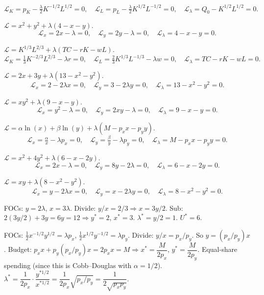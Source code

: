 \begin{solutions}
  \[
  \mathcal{L}_K = p_K - \tfrac{\lambda}{2} K^{-1/2} L^{1/2} = 0, \quad \mathcal{L}_L = p_L - \tfrac{\lambda}{2} K^{1/2} L^{-1/2} = 0, \quad \mathcal{L}_\lambda = Q_0 - K^{1/2} L^{1/2} = 0.
  \]
  \item $\mathcal{L} = x^2 + y^2 + \lambda(4 - x - y)$.
  \[
  \mathcal{L}_x = 2 x - \lambda = 0, \quad \mathcal{L}_y = 2 y - \lambda = 0, \quad \mathcal{L}_\lambda = 4 - x - y = 0.
  \]
  \item $\mathcal{L} = K^{1/3} L^{2/3} + \lambda(TC - r K - w L)$.
  \[
  \mathcal{L}_K = \tfrac{1}{3} K^{-2/3} L^{2/3} - \lambda r = 0, \quad \mathcal{L}_L = \tfrac{2}{3} K^{1/3} L^{-1/3} - \lambda w = 0, \quad \mathcal{L}_\lambda = TC - r K - w L = 0.
  \]
  \item $\mathcal{L} = 2 x + 3 y + \lambda(13 - x^2 - y^2)$.
  \[
  \mathcal{L}_x = 2 - 2 \lambda x = 0, \quad \mathcal{L}_y = 3 - 2 \lambda y = 0, \quad \mathcal{L}_\lambda = 13 - x^2 - y^2 = 0.
  \]
  \item $\mathcal{L} = x y^2 + \lambda(9 - x - y)$.
  \[
  \mathcal{L}_x = y^2 - \lambda = 0, \quad \mathcal{L}_y = 2 x y - \lambda = 0, \quad \mathcal{L}_\lambda = 9 - x - y = 0.
  \]
  \item $\mathcal{L} = \alpha \ln(x) + \beta \ln(y) + \lambda(M - p_x x - p_y y)$.
  \[
  \mathcal{L}_x = \tfrac{\alpha}{x} - \lambda p_x = 0, \quad \mathcal{L}_y = \tfrac{\beta}{y} - \lambda p_y = 0, \quad \mathcal{L}_\lambda = M - p_x x - p_y y = 0.
  \]
  \item $\mathcal{L} = x^2 + 4 y^2 + \lambda(6 - x - 2 y)$.
  \[
  \mathcal{L}_x = 2 x - \lambda = 0, \quad \mathcal{L}_y = 8 y - 2 \lambda = 0, \quad \mathcal{L}_\lambda = 6 - x - 2 y = 0.
  \]
  \item $\mathcal{L} = x y + \lambda(8 - x^2 - y^2)$.
  \[
  \mathcal{L}_x = y - 2 \lambda x = 0, \quad \mathcal{L}_y = x - 2 \lambda y = 0, \quad \mathcal{L}_\lambda = 8 - x^2 - y^2 = 0.
  \]
  \item FOCs: $y = 2 \lambda$, $x = 3 \lambda$. Divide: $y/x = 2/3 \Rightarrow x = 3 y / 2$. Sub: $2 (3 y/2) + 3 y = 6 y = 12 \Rightarrow y^* = 2$, $x^* = 3$. $\lambda^* = y/2 = 1$. $U^* = 6$.
  \item FOCs: $\tfrac{1}{2} x^{-1/2} y^{1/2} = \lambda p_x$, $\tfrac{1}{2} x^{1/2} y^{-1/2} = \lambda p_y$. Divide: $y/x = p_x/p_y$. So $y = (p_x/p_y) x$. Budget: $p_x x + p_y (p_x/p_y) x = 2 p_x x = M \Rightarrow x^* = \dfrac{M}{2 p_x}$, $y^* = \dfrac{M}{2 p_y}$. Equal-share spending (since this is Cobb--Douglas with $\alpha = 1/2$). $\lambda^* = \dfrac{1}{2 p_x} \cdot \dfrac{y^{*1/2}}{x^{*1/2}} = \dfrac{1}{2 p_x} \sqrt{p_x/p_y} = \dfrac{1}{2\sqrt{p_x p_y}}$.

\end{solutions}
